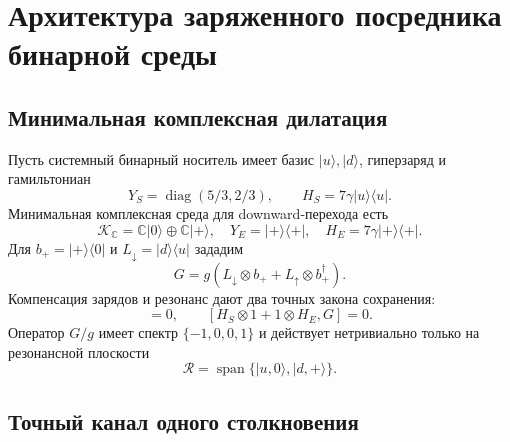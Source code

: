 \chapter{Архитектура заряженного посредника бинарной среды}
\label{ch:v8-charged-environment-mediator-architecture}

\section{Минимальная комплексная дилатация}

Пусть системный бинарный носитель имеет базис $|u\rangle,|d\rangle$,
гиперзаряд и гамильтониан
\begin{equation}
 Y_S=\operatorname{diag}(5/3,2/3),\qquad
 H_S=7\gamma |u\rangle\langle u|.
 \label{eq:v8-charged-mediator-system-data}
\end{equation}
Минимальная комплексная среда для downward-перехода есть
\begin{equation}
 \mathcal K_{\mathbb C}=\mathbb C|0\rangle\oplus\mathbb C|+\rangle,
 \quad Y_E=|+\rangle\langle+|,
 \quad H_E=7\gamma |+\rangle\langle+|.
 \label{eq:v8-charged-mediator-complex-environment}
\end{equation}
Для $b_+=|+\rangle\langle0|$ и $L_\downarrow=|d\rangle\langle u|$
зададим
\begin{equation}
 G=g\left(L_\downarrow\otimes b_+
 +L_\uparrow\otimes b_+^\dagger\right).
 \label{eq:v8-charged-mediator-interaction}
\end{equation}
Компенсация зарядов и резонанс дают два точных закона сохранения:
\begin{equation}
 [Y_S\otimes1+1\otimes Y_E,G]=0,\qquad
 [H_S\otimes1+1\otimes H_E,G]=0.
 \label{eq:v8-charged-mediator-conservation}
\end{equation}
Оператор $G/g$ имеет спектр $\{-1,0,0,1\}$ и действует нетривиально
только на резонансной плоскости
\begin{equation}
 \mathcal R=\operatorname{span}\{|u,0\rangle,|d,+\rangle\}.
 \label{eq:v8-charged-mediator-resonant-plane}
\end{equation}

\section{Точный канал одного столкновения}

